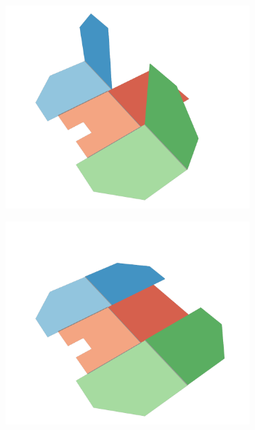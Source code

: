 \begin{figure}[h]
\begin{subfigure}[t]{\subfigureWidth}
		\label{fig:sub:deployment-sequence-ismenius-cavus-full-bow-and-stern}
	\end{subfigure}\\[0.8ex]
	\begin{subfigure}[t]{\subfigureWidth}
        \centering
		\includegraphics[height=\graphicsHeight]{sections/power-system-design/solar-array/images/deployment/ismenius-cavus/solar_array_deployment_ismenius_cavus_100.png}
		\label{fig:sub:deployment-sequence-ismenius-cavus-mid-quarter}
	\end{subfigure}\hspace*{2.5cm}
    \begin{subfigure}[t]{\subfigureWidth}
        \centering
		\includegraphics[height=\graphicsHeight]{sections/power-system-design/solar-array/images/deployment/ismenius-cavus/solar_array_deployment_ismenius_cavus_130.png}

\end{subfigure}
\end{figure}
